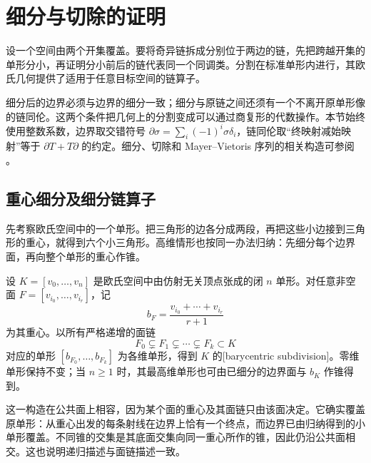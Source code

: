 
% 
% 

\section{细分与切除的证明}
\label{g2:sec:0203}

设一个空间由两个开集覆盖。要将奇异链拆成分别位于两边的链，先把跨越开集的单形分小，再证明分小前后的链代表同一个同调类。分割在标准单形内进行，其欧氏几何提供了适用于任意目标空间的链算子。

\ProseParagraphBreak

细分后的边界必须与边界的细分一致；细分与原链之间还须有一个不离开原单形像的链同伦。这两个条件把几何上的分割变成可以通过商复形的代数操作。本节始终使用整数系数，边界取交错符号 \(\partial\sigma=\sum_i(-1)^i\sigma\delta_i\)，链同伦取“终映射减始映射”等于 \(\partial T+T\partial\) 的约定。细分、切除和 Mayer--Vietoris 序列的相关构造可参阅 \cite[第2.1节，Exact Sequences and Excision；第2.2节，Mayer--Vietoris Sequences]{Hatcher2002}。

\subsection{重心细分及细分链算子}
\label{g2:subsec:0203:01}

先考察欧氏空间中的一个单形。把三角形的边各分成两段，再把这些小边接到三角形的重心，就得到六个小三角形。高维情形也按同一办法归纳：先细分每个边界面，再向整个单形的重心作锥。

\begin{definition}\label{g2:def:barycentric-subdivision}
	设 \(K=[v_0,\ldots,v_n]\) 是欧氏空间中由仿射无关顶点张成的闭 \(n\) 单形。对任意非空面 \(F=[v_{i_0},\ldots,v_{i_r}]\)，记
	\[
		b_F=\frac{v_{i_0}+\cdots+v_{i_r}}{r+1}
	\]
	为其重心。以所有严格递增的面链
	\[
		F_0\subsetneq F_1\subsetneq\cdots\subsetneq F_k\subset K
	\]
	对应的单形 \([b_{F_0},\ldots,b_{F_k}]\) 为各维单形，得到 \(K\) 的[barycentric subdivision]。零维单形保持不变；当 \(n\ge1\) 时，其最高维单形也可由已细分的边界面与 \(b_K\) 作锥得到。
\end{definition}

这一构造在公共面上相容，因为某个面的重心及其面链只由该面决定。它确实覆盖原单形：从重心出发的每条射线在边界上恰有一个终点，而边界已由归纳得到的小单形覆盖。不同锥的交集是其底面交集向同一重心所作的锥，因此仍沿公共面相交。这也说明递归描述与面链描述一致。

